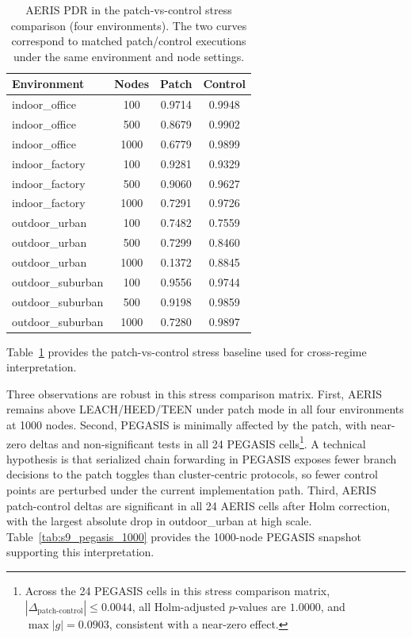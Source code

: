 ﻿\documentclass[sensors,article,submit,moreauthors,pdftex]{Definitions/mdpi}
\begin{document}
\begin{table}[H]
\caption{AERIS PDR in the patch-vs-control stress comparison (four environments). The two curves correspond to matched patch/control executions under the same environment and node settings.}
\label{tab:s9_patch_control}
\centering
\begin{tabular}{lccc}
\toprule
Environment & Nodes & Patch & Control \\
\midrule
indoor\_office & 100  & 0.9714 & 0.9948 \\
indoor\_office & 500  & 0.8679 & 0.9902 \\
indoor\_office & 1000 & 0.6779 & 0.9899 \\
indoor\_factory & 100  & 0.9281 & 0.9329 \\
indoor\_factory & 500  & 0.9060 & 0.9627 \\
indoor\_factory & 1000 & 0.7291 & 0.9726 \\
outdoor\_urban & 100  & 0.7482 & 0.7559 \\
outdoor\_urban & 500  & 0.7299 & 0.8460 \\
outdoor\_urban & 1000 & 0.1372 & 0.8845 \\
outdoor\_suburban & 100  & 0.9556 & 0.9744 \\
outdoor\_suburban & 500  & 0.9198 & 0.9859 \\
outdoor\_suburban & 1000 & 0.7280 & 0.9897 \\
\bottomrule
\end{tabular}
\end{table}

Table~\ref{tab:s9_patch_control} provides the patch-vs-control stress baseline used for cross-regime interpretation.

Three observations are robust in this stress comparison matrix. First, AERIS remains above LEACH/HEED/TEEN under patch mode in all four environments at 1000 nodes. Second, PEGASIS is minimally affected by the patch, with near-zero deltas and non-significant tests in all 24 PEGASIS cells\footnote{Across the 24 PEGASIS cells in this stress comparison matrix, \(|\Delta_{\text{patch-control}}| \le 0.0044\), all Holm-adjusted \(p\)-values are \(1.0000\), and \(\max |g| = 0.0903\), consistent with a near-zero effect.}. A technical hypothesis is that serialized chain forwarding in PEGASIS exposes fewer branch decisions to the patch toggles than cluster-centric protocols, so fewer control points are perturbed under the current implementation path. Third, AERIS patch-control deltas are significant in all 24 AERIS cells after Holm correction, with the largest absolute drop in outdoor\_urban at high scale. Table~\ref{tab:s9_pegasis_1000} provides the 1000-node PEGASIS snapshot supporting this interpretation.
\end{document}
